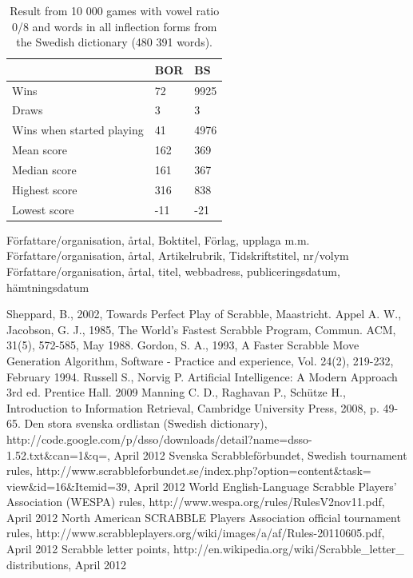 \documentclass[a4paper, 12pt]{report}
\begin{document}
\begin{table}[h]
\centering
    \begin{tabular}{ l | l | l }
   	& BOR & BS \\
   	\hline
   	Wins & 72 & 9925 \\
	Draws & 3 & 3 \\
	Wins when started playing & 41 & 4976 \\   	
	Mean score & 162 & 369 \\
	Median score & 161 & 367 \\	 	 
	Highest score & 316 & 838 \\
	Lowest score & -11 & -21 \\		
    \end{tabular}
\caption{Result from 10 000 games with vowel ratio 0/8 and words in all inflection forms from the Swedish dictionary (480 391 words).}
\label{tab:borbsstats0}
\end{table}


Författare/organisation, årtal, Boktitel, Förlag, upplaga m.m.
Författare/organisation, årtal, Artikelrubrik, Tidskriftstitel, nr/volym
Författare/organisation, årtal, titel, webbadress, publiceringsdatum, hämtningsdatum


\begin{thebibliography}{100}  
   Sheppard, B., 2002, Towards Perfect Play of Scrabble, Maastricht.
   Appel A. W., Jacobson, G. J., 1985, The World’s Fastest Scrabble Program, Commun. ACM, 31(5), 572-585, May 1988.
 Gordon, S. A., 1993, A Faster Scrabble Move Generation Algorithm, Software - Practice and experience, Vol. 24(2), 219-232, February 1994.
 Russell S., Norvig P. Artificial Intelligence: A Modern Approach 3rd ed. Prentice Hall. 2009
 Manning C. D., Raghavan P., Schütze H., Introduction to Information Retrieval, Cambridge University Press, 2008, p. 49-65.
 Den stora svenska ordlistan (Swedish dictionary), http://code.google.com/p/dsso/downloads/detail?name=dsso-1.52.txt\&can=1\&q=, April 2012
 Svenska Scrabbleförbundet, Swedish tournament rules, http://www.scrabbleforbundet.se/index.php?option=content\&task= view\&id=16\&Itemid=39, April 2012
 World English-Language Scrabble Players’ Association (WESPA) rules, http://www.wespa.org/rules/RulesV2nov11.pdf, April 2012
 North American SCRABBLE Players Association official tournament rules, http://www.scrabbleplayers.org/wiki/images/a/af/Rules-20110605.pdf, April 2012
 Scrabble letter points, http://en.wikipedia.org/wiki/Scrabble\_letter\_ distributions, April 2012
\end{thebibliography}
\end{document}
